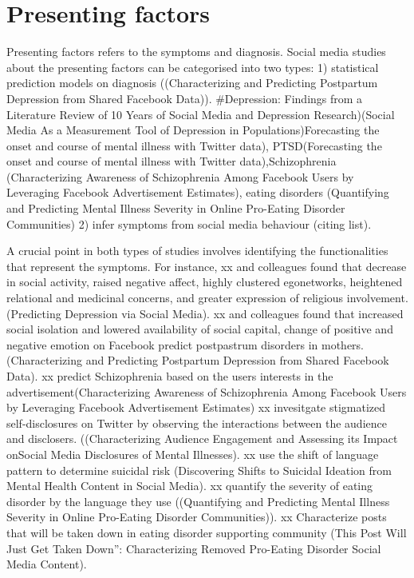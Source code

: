 \section{Presenting factors}

Presenting factors refers to the symptoms and diagnosis. Social media studies about the presenting factors can be categorised into two types: 1) statistical prediction models on diagnosis ((Characterizing and Predicting Postpartum Depression from Shared Facebook Data)). 
#Depression: Findings from a Literature Review of 10 Years of Social Media and Depression Research)(Social Media As a Measurement Tool of Depression in Populations)Forecasting the onset and course of mental illness with Twitter data), PTSD(Forecasting the onset and course of mental illness with Twitter data),Schizophrenia (Characterizing Awareness of Schizophrenia Among Facebook Users by Leveraging Facebook Advertisement Estimates), eating disorders (Quantifying and Predicting Mental Illness Severity in Online Pro-Eating Disorder Communities) 2) infer symptoms from social media behaviour (citing list). 

A crucial point in both types of studies involves identifying the functionalities that represent the symptoms. For instance, xx and colleagues found that decrease in social activity, raised negative affect, highly clustered egonetworks, heightened relational and medicinal concerns, and greater expression of religious involvement.(Predicting Depression via Social Media). xx and colleagues found that increased social isolation and lowered availability of social capital, change of positive and negative emotion on Facebook predict postpastrum disorders in mothers. (Characterizing and Predicting Postpartum Depression from Shared Facebook Data). xx predict Schizophrenia based on the users interests in the advertisement(Characterizing Awareness of Schizophrenia Among Facebook Users by Leveraging Facebook Advertisement Estimates) xx invesitgate stigmatized self-disclosures on Twitter by observing the interactions between the audience and disclosers. ((Characterizing Audience Engagement and Assessing its Impact onSocial Media Disclosures of Mental Illnesses). xx use the shift of language pattern to determine suicidal risk
(Discovering Shifts to Suicidal Ideation from Mental Health Content in Social Media). xx quantify the severity of eating disorder by the language they use ((Quantifying and Predicting Mental Illness Severity in Online Pro-Eating Disorder Communities)). xx Characterize posts that will be taken down in eating disorder supporting community (This Post Will Just Get Taken Down”: Characterizing Removed Pro-Eating Disorder Social Media Content).


